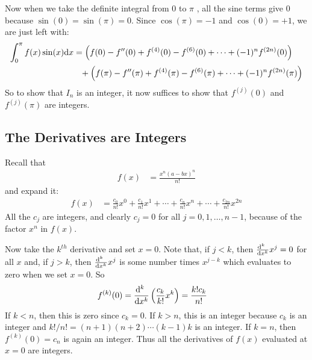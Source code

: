 Now when we take the definite integral from $0$ to $\pi$ , all the sine terms
give $0$ because $\sin(0)=\sin(\pi)=0$.
Since $\cos(\pi)=-1$ and $\cos(0)=+1$, we are just left with:
\begin{align*}
  \int_0^\pi f(x) \sin(x) \mathrm{d}x
  &= \left( f(0) -f''(0) + f^{(4)}(0) - f^{(6)}(0) + \cdots + (-1)^n f^{(2n)}(0) \right)\\
  &\phantom{=} + \left( f(\pi) -f''(\pi) + f^{(4)}(\pi) - f^{(6)}(\pi) + \cdots + (-1)^n f^{(2n)}(\pi) \right)
\end{align*}
So to show that $I_n$ is an integer, it now suffices to show that
$f^{(j)}(0)$ and  $f^{(j)}(\pi)$ are integers.

\subsection*{The Derivatives are Integers}
Recall that
\begin{align*}
  f(x) &= \frac{x^n (a-bx)^n}{n!}
\end{align*}
and expand it:
\begin{align*}
  f(x) &= \frac{c_0}{n!} x^0 + \frac{c_1}{n!} x^1 + \cdots + \frac{c_n}{n!} x^n + \cdots + \frac{c_{2n}}{n!} x^{2n}
\end{align*}
All the $c_j$ are integers, and clearly $c_j=0$ for all $j=0,1,\dots,n-1$,
because of the factor $x^n$ in $f(x)$.

Now take the $k^{th}$ derivative and set $x=0$. Note that, if $j<k$,
then $\frac{\dee{}^k\ }{\dee{}x^k}x^j=0$ for all $x$ and, if $j>k$,
then $\frac{\mathrm{d}^k\ }{\mathrm{d}x^k}x^j$ is some number times $x^{j-k}$
which evaluates to zero when we set $x=0$. So
\begin{align*}
  f^{(k)}(0) &= \frac{\dee{}^k\ }{\dee{}x^k}\left(\frac{c_k}{k!}x^k\right)
              = \frac{k! c_k}{n!}
\end{align*}
If $k<n$, then this is zero since $c_k=0$. If $k>n$, this is an integer
because $c_k$ is an integer and $k!/n! = (n+1)(n+2)\cdots(k-1)k$ is an integer.
If $k=n$, then $f^{(k)}(0)=c_n$ is again an integer.
Thus all the derivatives of $f(x)$ evaluated at $x=0$ are integers.

